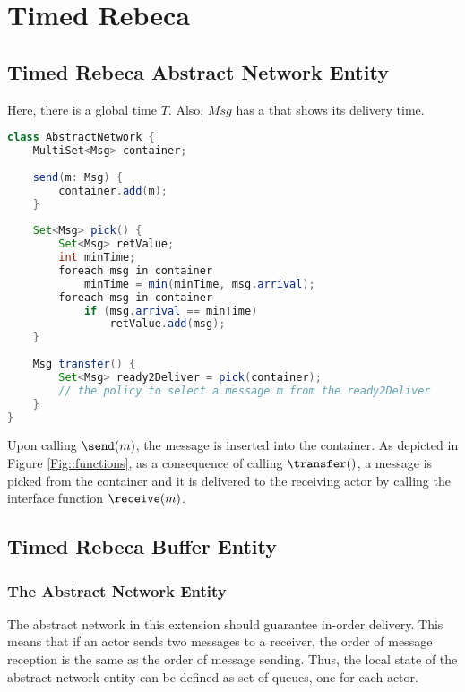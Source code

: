 \section{Timed Rebeca}


\subsection{Timed Rebeca Abstract Network Entity}

Here, there is a global time $T$.
Also, $Msg$ has a that shows its delivery time.
\begin{lstlisting}[language=java,escapechar=|]
class AbstractNetwork {
    MultiSet<Msg> container;
   
    send(m: Msg) {
        container.add(m);
    }
   
    Set<Msg> pick() {
        Set<Msg> retValue;
        int minTime;
        foreach msg in container
            minTime = min(minTime, msg.arrival);
        foreach msg in container
            if (msg.arrival == minTime)
                retValue.add(msg);
    }
    
    Msg transfer() {
        Set<Msg> ready2Deliver = pick(container);
        // the policy to select a message m from the ready2Deliver
    }
}
\end{lstlisting}

	
Upon calling $\send(m)$, the message is inserted into the container. As depicted in Figure \ref{Fig::functions}, as a consequence of calling $\transfer()$,  a message is picked from the container and it is delivered to the receiving actor by calling the interface function $\receive(m)$.
	
\subsection{Timed Rebeca Buffer Entity}


\subsubsection{The Abstract Network Entity}\label{classic::network}
The abstract network in this extension should guarantee in-order delivery. This means that if an actor sends two messages to a receiver, the order of message reception is the same as the order of message sending.  Thus, the local state of the abstract network entity can be defined as set of queues, one for each actor. 

